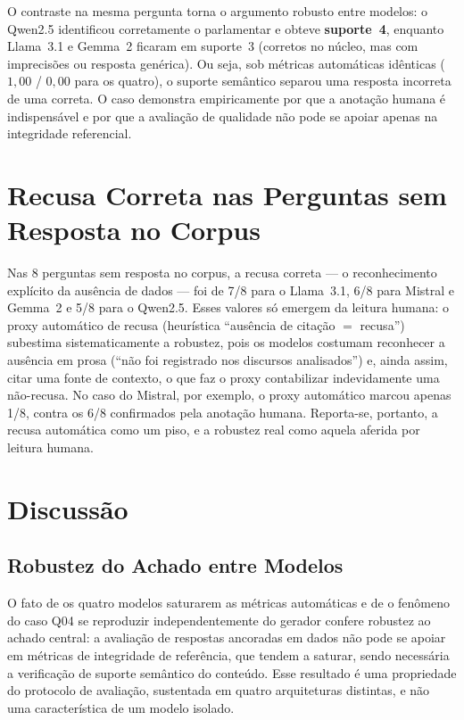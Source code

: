 O contraste na mesma pergunta torna o argumento robusto entre modelos: o Qwen2.5 identificou corretamente o parlamentar e obteve \textbf{suporte~4}, enquanto Llama~3.1 e Gemma~2 ficaram em suporte~3 (corretos no núcleo, mas com imprecisões ou resposta genérica). Ou seja, sob métricas automáticas idênticas ($1{,}00$ / $0{,}00$ para os quatro), o suporte semântico separou uma resposta incorreta de uma correta. O caso demonstra empiricamente por que a anotação humana é indispensável e por que a avaliação de qualidade não pode se apoiar apenas na integridade referencial.

\section{Recusa Correta nas Perguntas sem Resposta no Corpus}

Nas 8 perguntas sem resposta no corpus, a recusa correta --- o reconhecimento explícito da ausência de dados --- foi de 7/8 para o Llama~3.1, 6/8 para Mistral e Gemma~2 e 5/8 para o Qwen2.5. Esses valores só emergem da leitura humana: o proxy automático de recusa (heurística ``ausência de citação $=$ recusa'') subestima sistematicamente a robustez, pois os modelos costumam reconhecer a ausência em prosa (``não foi registrado nos discursos analisados'') e, ainda assim, citar uma fonte de contexto, o que faz o proxy contabilizar indevidamente uma não-recusa. No caso do Mistral, por exemplo, o proxy automático marcou apenas 1/8, contra os 6/8 confirmados pela anotação humana. Reporta-se, portanto, a recusa automática como um piso, e a robustez real como aquela aferida por leitura humana.

\section{Discussão}

\subsection{Robustez do Achado entre Modelos}
O fato de os quatro modelos saturarem as métricas automáticas e de o fenômeno do caso Q04 se reproduzir independentemente do gerador confere robustez ao achado central: a avaliação de respostas ancoradas em dados não pode se apoiar em métricas de integridade de referência, que tendem a saturar, sendo necessária a verificação de suporte semântico do conteúdo. Esse resultado é uma propriedade do protocolo de avaliação, sustentada em quatro arquiteturas distintas, e não uma característica de um modelo isolado.

